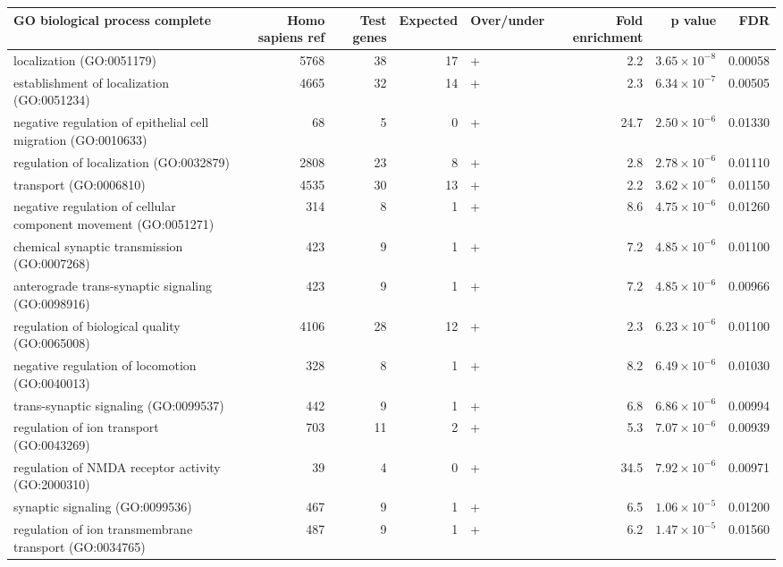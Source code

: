 \begin{table}[ht]
\centering
\begin{adjustbox}{width=\textwidth}
\begin{tabular}{lrrrlrrr}
  \hline
GO biological process complete & Homo sapiens ref & Test genes & Expected & Over/under & Fold enrichment & p value & FDR \\ 
  \hline
localization (GO:0051179) & 5768 & 38 & 17 & + & 2.2 & $3.65 \times 10^{-8}$ & 0.00058 \\ 
  establishment of localization (GO:0051234) & 4665 & 32 & 14 & + & 2.3 & $6.34 \times 10^{-7}$ & 0.00505 \\ 
  negative regulation of epithelial cell migration (GO:0010633) & 68 & 5 & 0 & + & 24.7 & $2.50 \times 10^{-6}$ & 0.01330 \\ 
  regulation of localization (GO:0032879) & 2808 & 23 & 8 & + & 2.8 & $2.78 \times 10^{-6}$ & 0.01110 \\ 
  transport (GO:0006810) & 4535 & 30 & 13 & + & 2.2 & $3.62 \times 10^{-6}$ & 0.01150 \\ 
  negative regulation of cellular component movement (GO:0051271) & 314 & 8 & 1 & + & 8.6 & $4.75 \times 10^{-6}$ & 0.01260 \\ 
  chemical synaptic transmission (GO:0007268) & 423 & 9 & 1 & + & 7.2 & $4.85 \times 10^{-6}$ & 0.01100 \\ 
  anterograde trans-synaptic signaling (GO:0098916) & 423 & 9 & 1 & + & 7.2 & $4.85 \times 10^{-6}$ & 0.00966 \\ 
  regulation of biological quality (GO:0065008) & 4106 & 28 & 12 & + & 2.3 & $6.23 \times 10^{-6}$ & 0.01100 \\ 
  negative regulation of locomotion (GO:0040013) & 328 & 8 & 1 & + & 8.2 & $6.49 \times 10^{-6}$ & 0.01030 \\ 
  trans-synaptic signaling (GO:0099537) & 442 & 9 & 1 & + & 6.8 & $6.86 \times 10^{-6}$ & 0.00994 \\ 
  regulation of ion transport (GO:0043269) & 703 & 11 & 2 & + & 5.3 & $7.07 \times 10^{-6}$ & 0.00939 \\ 
  regulation of NMDA receptor activity (GO:2000310) & 39 & 4 & 0 & + & 34.5 & $7.92 \times 10^{-6}$ & 0.00971 \\ 
  synaptic signaling (GO:0099536) & 467 & 9 & 1 & + & 6.5 & $1.06 \times 10^{-5}$ & 0.01200 \\ 
  regulation of ion transmembrane transport (GO:0034765) & 487 & 9 & 1 & + & 6.2 & $1.47 \times 10^{-5}$ & 0.01560 \\ 

\end{tabular}
\end{adjustbox}
\end{table}
